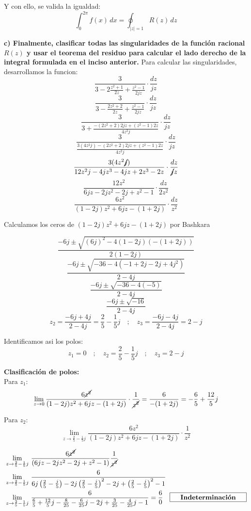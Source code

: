 \documentclass[12pt]{report}
\begin{document}
Y con ello, se valida la igualdad:
$$ \int_{0}^{2\pi} f(x) \, dx = \oint_{|z|=1} R(z) \, dz$$ 

\vspace{6cm}

\textbf{c)  Finalmente, clasificar todas las singularidades de la función racional $R(z)$ y usar el teorema del residuo para calcular el lado derecho de la integral formulada en el inciso anterior.}
Para calcular las singularidades, desarrollamos la funcion:
$$\frac{3}{3 - 2\frac{z^{2} + 1}{2z} + \frac{z^{2} - 1}{2jz}} \cdot \frac{dz}{jz}$$ 
$$\frac{3}{3 - \frac{2z^{2} + 2}{2z} + \frac{z^{2} - 1}{2jz}} \cdot \frac{dz}{jz}$$ 
$$\frac{3}{3 + \frac{-(2z^{2} + 2)2jz + (z^2-1)2z}{4z^2j}} \cdot \frac{dz}{jz}$$ 
$$\frac{3}{\frac{3(4z^2j) - (2z^{2} + 2)2jz + (z^2-1)2z}{4z^2j}} \cdot \frac{dz}{jz}$$ 
$$\frac{3(4z^2\cancel{j})}{12z^2j - 4jz^{3} - 4jz + 2z^3 - 2z} \cdot \frac{dz}{\cancel{j}z}$$ 
$$\frac{12z^2}{6jz - 2jz^{2} - 2j + z^2 - 1} \cdot \frac{dz}{2z^2}$$ 
$$\frac{6z^2}{(1- 2j)z^{2} + 6jz - (1 + 2j)} \cdot \frac{dz}{z^2}$$ 

Calculamos los ceros de $(1- 2j)z^{2} + 6jz - (1 + 2j)$ por Bashkara

$$\frac{-6j \pm \sqrt{(6j)^2-4(1-2j)(-(1+2j))}} {2(1-2j)} $$
$$\frac{-6j \pm \sqrt{-36-4(-1+2j-2j+4j^2)}} {2-4j} $$
$$\frac{-6j \pm \sqrt{-36-4(-5)}} {2-4j} $$
$$\frac{-6j \pm \sqrt{-16}} {2-4j} $$
$$z_2 = \frac{-6j + 4j} {2-4j} = \frac{2}{5}-\frac{1}{5}j\quad;\quad z_3 = \frac{-6j - 4j} {2-4j} = 2-j$$

Identificamos asi los polos:
$$z_1=0\quad;\quad z_2=\frac{2}{5}-\frac{1}{5}j \quad;\quad z_3=2-j$$

\vspace{2cm}

\textbf{Clasificación de polos:}\\[6pt]
Para $z_1$:
$$\lim_{z \to 0}\frac{6\cancel{z^2}}{(1- 2j)z^{2} + 6jz - (1 + 2j)} \cdot \frac{1}{\cancel{z^2}}
=\frac{6}{- (1 + 2j)}=-\frac{6}{5}+\frac{12}{5}j$$ 
\begin{center}\end{center}

Para $z_2$:
$$\lim_{z \to \frac{2}{5}-\frac{1}{5}j}\frac{6z^2}{(1- 2j)z^{2} + 6jz - (1 + 2j)} \cdot \frac{1}{z^2}
$$

\begin{align*}
&\lim_{z \to \frac{2}{5}-\frac{1}{5}j}\,\frac{6\cancel{z^2}}{(6jz-2jz^2-2j+z^2-1)}\frac{1}{\cancel{z^2}}\\
& \lim_{z \to \frac{2}{5}-\frac{1}{5}j}\, \frac{6}{6j\left(\frac{2}{5}-\frac{j}{5} \right)-2j\left(\frac{2}{5}-\frac{j}{5} \right)^2-2j+\left(\frac{2}{5}-\frac{j}{5} \right)^2-1}\\
&\lim_{z \to \frac{2}{5}-\frac{1}{5}j}\,\frac{6}{\frac{6}{5}+\frac{12}{5}j-\frac{8}{25}-\frac{6}{25}j-2j+\frac{3}{25}-\frac{4}{25}j-1}=\frac{6}{0} \quad \framebox[4cm][c]{\textbf{Indeterminación}}\\
\end{align*}
\end{document}
